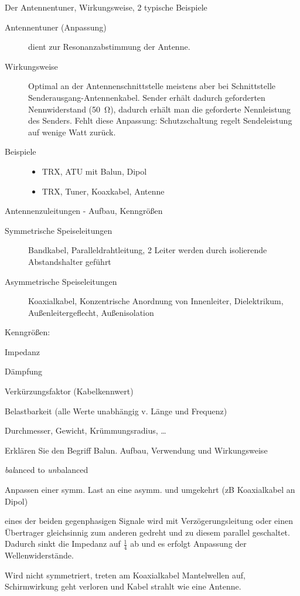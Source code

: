 \documentclass[avery5371,grid,frame,a4paper]{flashcards}
\newcommand{\card}[3]{
  \begin{flashcard}[{\chap} -- #1]{#2}#3\end{flashcard}
}
\begin{document}
\card{61}{Der Antennentuner, Wirkungsweise, 2 typische Beispiele}{
  \small
  \begin{description}
    \item[Antennentuner (Anpassung)]
      dient zur Resonanzabstimmung der Antenne.
    \item[Wirkungsweise]
      Optimal an der Antennenschnittstelle meistens aber bei Schnittstelle Senderausgang-Antennenkabel.
      Sender erhält dadurch geforderten Nennwiderstand (\SI{50}{\ohm}), dadurch erhält man die geforderte Nennleistung des Senders. Fehlt diese Anpassung: Schutzschaltung regelt Sendeleistung auf wenige Watt zurück.
    \item[Beispiele]
      \begin{itemize}
        \item TRX, ATU mit Balun, Dipol
        \item TRX, Tuner, Koaxkabel, Antenne
      \end{itemize}
  \end{description}
}
\card{62}{Antennenzuleitungen - Aufbau, Kenngrößen}{
  \small
    \begin{description}
      \item[Symmetrische Speiseleitungen]
        Bandkabel, Paralleldrahtleitung,
        2 Leiter werden durch isolierende Abstandshalter geführt
      \item[Asymmetrische Speiseleitungen]
        Koaxialkabel, Konzentrische Anordnung von Innenleiter, Dielektrikum, Außenleitergeflecht, Außenisolation
    \end{description}
  Kenngrößen:
    \begin{itemize*}
      \item Impedanz
      \item Dämpfung
      \item Verkürzungsfaktor (Kabelkennwert)
      \item Belastbarkeit (alle Werte unabhängig v. Länge und Frequenz)
      \item Durchmesser, Gewicht, Krümmungsradius, \dots
    \end{itemize*}
}
\card{63}{Erklären Sie den Begriff Balun. Aufbau, Verwendung und Wirkungsweise}{
  \small
  \begin{description}\itemsep-1pt
    \item[Balun] \emph{bal}anced to \emph{un}balanced
    \item[Verwendung]
      Anpassen einer symm. Last an eine asymm. und umgekehrt
      (zB Koaxialkabel an Dipol)
    \item[Wirkungsweise]
      eines der beiden gegenphasigen Signale wird mit Verzögerungsleitung oder einen Übertrager gleichsinnig zum anderen gedreht und zu diesem parallel geschaltet. Dadurch sinkt die Impedanz auf $\frac14$ ab und es erfolgt Anpassung der Wellenwiderstände.
  \end{description}
  Wird nicht symmetriert, treten am Koaxialkabel Mantelwellen auf, Schirmwirkung geht verloren und Kabel strahlt wie eine Antenne.
}
\end{document}
